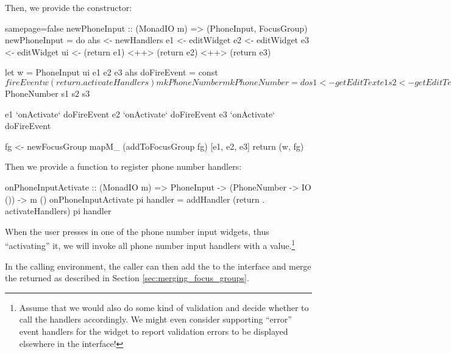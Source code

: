Then, we provide the constructor:

\begin{haskellcode*}{samepage=false}
 newPhoneInput :: (MonadIO m) => (PhoneInput, FocusGroup)
 newPhoneInput = do
   ahs <- newHandlers
   e1 <- editWidget
   e2 <- editWidget
   e3 <- editWidget
   ui <- (return e1) <++> (return e2) <++> (return e3)

   let w = PhoneInput ui e1 e2 e3 ahs
       doFireEvent = const $
         fireEvent w (return . activateHandlers) mkPhoneNumber

       mkPhoneNumber = do
         s1 <- getEditText e1
         s2 <- getEditText e2
         s3 <- getEditText e3
         return $ PhoneNumber s1 s2 s3

   e1 `onActivate` doFireEvent
   e2 `onActivate` doFireEvent
   e3 `onActivate` doFireEvent

   fg <- newFocusGroup
   mapM_ (addToFocusGroup fg) [e1, e2, e3]
   return (w, fg)
\end{haskellcode*}

Then we provide a function to register phone number handlers:

\begin{haskellcode}
 onPhoneInputActivate :: (MonadIO m) => PhoneInput
                      -> (PhoneNumber -> IO ()) -> m ()
 onPhoneInputActivate pi handler =
   addHandler (return . activateHandlers) pi handler
\end{haskellcode}

When the user presses  in one of the phone number input
widgets, thus ``activating'' it, we will invoke all phone number input
handlers with a  value.\footnote{Assume that we would
  also do some kind of validation and decide whether to call the
  handlers accordingly.  We might even consider supporting ``error''
  event handlers for the widget to report validation errors to be
  displayed elsewhere in the interface!}

In the calling environment, the caller can then add the
 to the interface and merge the returned
 as described in Section
\ref{sec:merging_focus_groups}.
